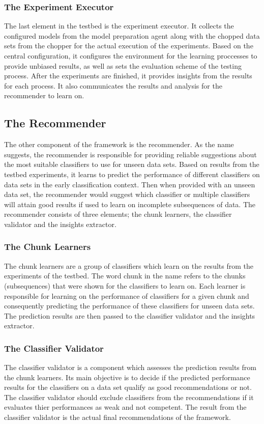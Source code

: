 \subsubsection*{The Experiment Executor}
\label{ExperimentExecutor}
The last element in the testbed is the experiment executor.
It collects the configured models from the model preparation agent along with the chopped data sets from the chopper for the actual execution of the experiments.
Based on the central configuration, it configures the environment for the learning proccesses to provide unbiased results, as well as sets the evaluation scheme of the testing process.
After the experiments are finished, it provides insights from the results for each process.
It also communicates the results and analysis for the recommender to learn on.

\subsection{The Recommender}
\label{SubsectionRecommender}
The other component of the framework is the recommender.
As the name suggests, the recommender is responsible for providing reliable suggestions about the most suitable classifiers to use for unseen data sets.
Based on results from the testbed experiments, it learns to predict the performance of different classifiers on data sets in the early classification context.
Then when provided with an unseen data set, the recommender would suggest which classifier or multiple classifiers will attain good results if used to learn
on incomplete subsequences of data. The recommender consists of three elements; the chunk learners, the classifier validator and the insights extractor.

\subsubsection*{The Chunk Learners}
\label{ChunkLearners}
The chunk learners are a group of classifiers which learn on the results from the experiments of the testbed.
The word chunk in the name refers to the chunks (subsequences) that were shown for the classifiers to learn on.
Each learner is responsible for learning on the performance of classifiers for a given chunk and consequently predicting the performance of these classifiers for unseen data sets.
The prediction results are then passed to the classifier validator and the insights extractor.

\subsubsection*{The Classifier Validator}
\label{ClassifierValidator}
The classifier validator is a component which assesses the prediction results from the chunk learners.
Its main objective is to decide if the predicted performance results for the classifiers on a data set qualify as good recommendations or not.
The classifier validator should exclude classifiers from the recommendations if it evaluates thier performances as weak and not competent.
The result from the classifier validator is the actual final recommendations of the framework.


